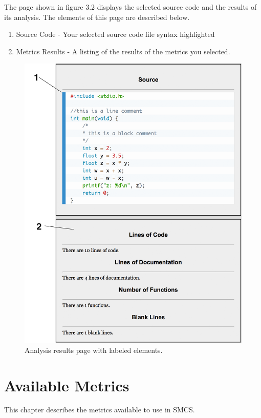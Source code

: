 \documentclass{scrreprt}
\begin{document}
	The page shown in figure 3.2 displays the selected source code and the results of its analysis. The elements of this page are described below.
	
	\begin{enumerate}
		\item Source Code - Your selected source code file syntax highlighted
		\item Metrics Results - A listing of the results of the metrics you selected.
	\end{enumerate}
	
	\begin{figure}[H]
		\centering
		\includegraphics[scale=0.3]{lguir.png}
		\caption{Analysis results page with labeled elements.}
	\end{figure}
	

	{\let\clearpage\relax \chapter{Available Metrics}}
	This chapter describes the metrics available to use in SMCS.
	
\end{document}
